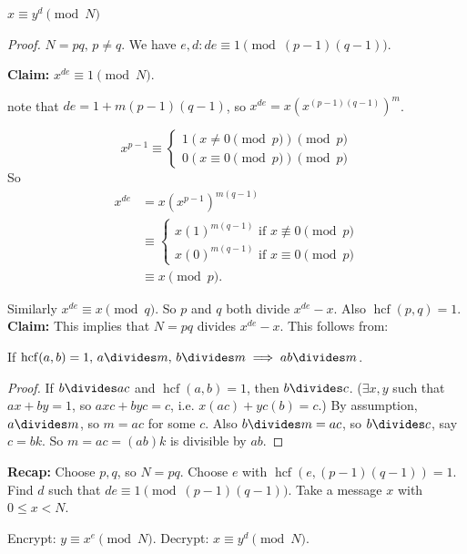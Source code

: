 \documentclass[10pt]{scrartcl}
\DeclareMathOperator{\hcf}{hcf}
\begin{document}
\begin{theorem}
	$x \equiv y^d \pmod{N}$
\end{theorem}
\begin{proof}
$N = pq,\, p \neq q$. We have $e,d: de \equiv 1 \pmod{(p-1)(q-1)}$. 

\textbf{Claim:} $x^{de} \equiv 1 \pmod{N}$. 

note that $de = 1 + m(p-1)(q-1)$, so $x^{de} = x\left(x^{(p-1)(q-1)}\right)^m$. 

\[x^{p-1} \equiv \begin{cases}
 1 (x \neq 0 \pmod{p}) \pmod{p}\\
 0 ( x \equiv 0 \pmod{p}) \pmod{p}	
 \end{cases}
\]	
So 
\[
\begin{aligned}
  x^{de} &= x(x^{p-1})^{m(q-1)}\\[.2cm]
  &\equiv \begin{cases}
 x(1)^{m(q-1)} \text{ if } x \not\equiv 0 \pmod{p}\\[.2cm]
 x(0)^{m(q-1)} \text{ if } x \equiv 0 \pmod{p}
 \end{cases}\\
 &\equiv x \pmod{p}.	
 \end{aligned}
\]

Similarly $x^{de} \equiv x \pmod{q}$. So $p$ and $q$ both divide $x^{de} - x$. Also $\hcf(p,q) = 1$.\\

\textbf{Claim:} This implies that $N = pq$ divides $x^{de} -x$. This follows from:

\begin{lemma}
If $\hcf(a,b) = 1,\, a \divides m,\, b \divides m \implies ab \divides m$. 	
\end{lemma}
\emph{Proof.} If $b\divides ac$ and $\hcf(a,b) = 1$, then $b \divides c$. ($\exists x,y$ such that $ax + by = 1$, so $axc + byc = c$, i.e. $x(ac) + yc(b) = c$.) By assumption, $a \divides m$, so $m = ac$ for some $c$. Also $b \divides m = ac$, so $b \divides c$, say $c = bk$. So $m = ac = (ab)k$ is divisible by $ab$. 
\end{proof}\vspace*{5pt}


\textbf{Recap:} Choose $p,q$, so $N = pq$. Choose $e$ with $\hcf(e,(p-1)(q-1)) = 1$. Find $d$ such that $de \equiv 1 \pmod{(p-1)(q-1)}$. Take a message $x$ with $ 0 \leq x < N$. 

Encrypt: $y \equiv x^e \pmod{N}$. Decrypt: $x \equiv y^d \pmod{N}$.\\
\end{document}
